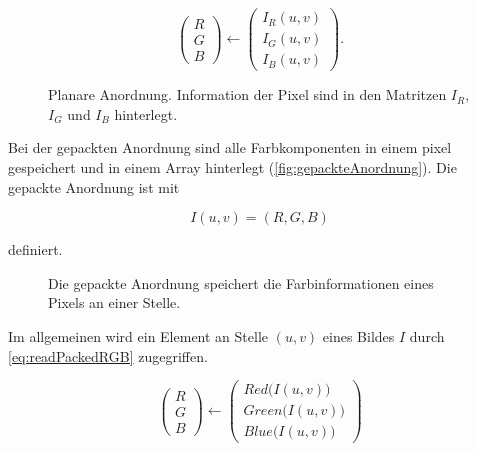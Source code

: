\begin{equation}
	\begin{pmatrix}
		R\\
		G\\
		B
	\end{pmatrix}
	\leftarrow
	\begin{pmatrix}
		I_R\left(u,v\right)\\
		I_G\left(u,v\right)\\
		I_B\left(u,v\right)
	\end{pmatrix}.
	\label{eq:readPlanarImage}
\end{equation}

\begin{figure}[!ht]
	\centering
	
	\caption{Planare Anordnung. Information der Pixel sind in den Matritzen $I_R$, $I_G$ und $I_B$ hinterlegt.}
	\label{fig:planareAnordnung}
\end{figure}

Bei der gepackten Anordnung sind alle Farbkomponenten in einem \gls{pixel} gespeichert und in einem Array hinterlegt (\autoref{fig:gepackteAnordnung}). Die gepackte Anordnung ist mit

\begin{equation}
	I\left(u,v\right) = \left(R,G,B\right)
	\label{eq:packedImage}
\end{equation}

definiert.

\begin{figure}[!ht]
	\centering
	
	\caption{Die gepackte Anordnung speichert die Farbinformationen eines Pixels an einer Stelle.}
	\label{fig:gepackteAnordnung}
\end{figure}

Im allgemeinen wird ein Element an Stelle $(u,v)$ eines Bildes $I$ durch \eqref{eq:readPackedRGB} zugegriffen.

\begin{equation}
	\begin{pmatrix}
		R\\
		G\\
		B
	\end{pmatrix}
	\leftarrow
	\begin{pmatrix}
		Red\bigl(I\left(u,v\right)\bigr)\\
		Green\bigl(I\left(u,v\right)\bigr)\\
		Blue\bigl(I\left(u,v\right)\bigr)
	\end{pmatrix}
	\label{eq:readPackedRGB}
\end{equation}

